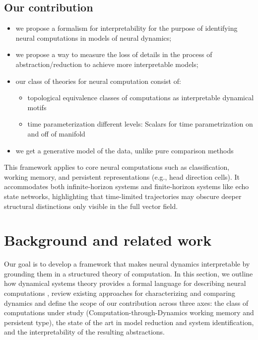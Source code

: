 \documentclass{article}
\theoremstyle{definition} \newtheorem{definition}{Definition}  \newtheorem{example}{Example}
\theoremstyle{remark} \newtheorem{remark}{Remark}
\newcounter{ct}
\begin{document}
\subsection{Our contribution}\label{sec:contribution}
\begin{itemize}
\item we propose a formalism for interpretability for the purpose of identifying neural computations in models of neural dynamics;
\item we propose a way to measure the loss of details in the process of abstraction/reduction to achieve more interpretable models;
\item our class of theories for neural computation consist of:
	\begin{itemize}
\item topological equivalence classes of computations as interpretable dynamical motifs
\item time parameterization different levels:
Scalars for time parametrization on and off of manifold 
\end{itemize}
\item we get a generative model of the data, unlike pure comparison methods
\end{itemize}

This framework applies to core neural computations such as classification, working memory, and persistent representations (e.g., head direction cells).
 It accommodates both infinite-horizon systems and finite-horizon systems like echo state networks, highlighting that time-limited trajectories may obscure deeper structural distinctions only visible in the full vector field.

\section{Background and related work}\label{sec:background}
Our goal is to develop a framework that makes neural dynamics interpretable by grounding them in a structured theory of computation.
In this section, we outline how dynamical systems theory provides a formal language for describing neural computations \citep{jaeger2021theory, jaeger2023timescales, elgazzar2024universal}, review existing approaches for characterizing and comparing dynamics%
and define the scope of our contribution across three axes: the class of computations under study (Computation-through-Dynamics working memory and persistent type), the state of the art in model reduction and system identification, and the interpretability of the resulting abstractions.
\end{document}
